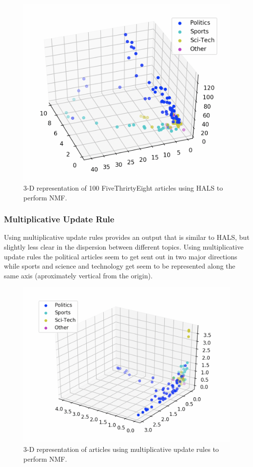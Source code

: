 \documentclass[12pt]{article}
\begin{document}
\begin{figure}
    \centering
    \includegraphics[scale=0.5]{hals.png}
    \caption{3-D representation of 100 FiveThrirtyEight articles using HALS to perform NMF.}
    \label{hals}
\end{figure}

\subsubsection*{Multiplicative Update Rule}

Using multiplicative update rules provides an output that is similar to HALS, but slightly less clear in the dispersion between different topics. Using multiplicative update rules the political articles seem to get sent out in two major directions while sports and science and technology get seem to be represented along the same axis (aproximately vertical from the origin).


\begin{figure}
    \centering
    \includegraphics[scale=0.5]{mult-update.png}
    \caption{3-D representation of articles using multiplicative update rules to perform NMF.}
    \label{mult-update}
\end{figure}
\end{document}
